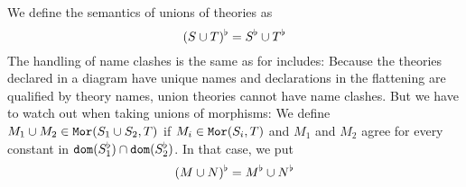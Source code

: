 \begin{union}
\begin{example}\label{sem:union}
We define the semantics of unions of theories as
\[(S\cup T)^\flat=S^\flat\cup T^\flat\]
The handling of name clashes is the same as for includes:
Because the theories declared in a diagram have unique names and declarations in the flattening are qualified by theory names, union theories cannot have name clashes.
But we have to watch out when taking unions of morphisms:
We define $M_1\cup M_2\in \mathtt{Mor}(S_1\cup S_2,T)$ if $M_i\in\mathtt{Mor}(S_i,T)$ and $M_1$ and $M_2$ agree for every constant in $\mathtt{dom}(S_1^\flat)\cap\mathtt{dom}(S_2^\flat)$.
In that case, we put
\[(M\cup N)^\flat=M^\flat\cup N^\flat\]
\end{example}
\end{union}


